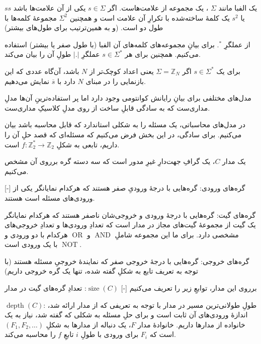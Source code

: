\documentclass[a4paper,12pt]{article}
\DeclareMathOperator{\size}{size}
\DeclareMathOperator{\depth}{depth}
\DeclareMathOperator{\AND}{AND}
\DeclareMathOperator{\OR}{OR}
\DeclareMathOperator{\NOT}{NOT}
\begin{document}


یک الفبا مانند 
\(\Sigma\)
، یک مجموعه از علامت‌هاست.
اگر 
\(s \in \Sigma\)
یکی از آن علامت‌ها باشد
\(s s\)
یا
\(s^2\)
یک کلمهٔ ساخته‌شده با تکرارِ آن علامت است و همچنین 
\(\Sigma^2\)
 مجموعهٔ کلمه‌ها با طول دو است. (و به همین‌ترتیب برای طول‌های بیشتر)

از عملگرِ 
\(.^*\)
برای بیانِ مجموعه‌های کلمه‌های آن الفبا (با طول صفر یا بیشتر) استفاده می‌کنیم. همچنین برای هر 
\(s \in \Sigma^*\)
عملگرِ \(|.|\) طولِ آن را بیان می‌کند.

برای یک 
\(s \in \Sigma^*\)
اگر 
\(\Sigma = \mathbb{Z}_N\)
یعنی اعداد کوچک‌تر از \(N\) باشد، آن‌گاه عددی که این بازنمایی را در مبنای \(N\) دارد با
\(\overline{s}\)
نمایش می‌دهیم.

مدل‌های مختلفی برای بیانِ رایانش کوانتومی وجود دارد اما پر استفاده‌ترینِ آن‌ها مدلِ مداری‌ست که به سادگی قابلِ ساخت از روی مدلِ کلاسیکِ مداری‌ست.

در مدل‌های محاسباتی، یک مسئله را به شکلی استاندارد که قابل محاسبه باشد بیان می‌کنیم. برای سادگی، در این بخش فرض می‌کنیم که مسئله‌ای که قصد حلِ آن را داریم، تابعی به شکلِ
\(f: \mathbb{Z}_2^* \to \mathbb{Z}_2\)
است.

 
یک مدار \(C\)، یک گرافِ جهت‌دارِ غیرِ مدور است که سه دسته گره برروی آن مشخص می‌کنیم.

[-]
 گره‌های ورودی: گره‌هایی با درجهٔ ورودیِ صفر هستند که هرکدام نمایانگر یکی از ورودی‌های مسئله است
هستند.

 گره‌های گیت: گره‌هایی با درجهٔ ورودی و خروجی‌شان ناصفر هستند که هرکدام نمایانگر یک گیت از مجموعهٔ گیت‌های مجاز در مدار است که تعدادِ ورودی‌ها و تعدادِ خروجی‌های مشخصی دارد. برای ما این مجموعه شاملِ 
\(\AND\)
و 
\(\OR\)
هرکدام با دو ورودی و 
\(\NOT\)
 با یک ورودی است.

 گره‌های خروجی: گره‌هایی با درجهٔ خروجی صفر که نمایندهٔ خروجیِ مسئله هستند (با توجه به تعریف تابع به شکلِ گفته شده، تنها یک گره خروجی داریم)


برروی این مدار، توابعِ زیر را تعریف می‌کنیم
[-]
\(\size(C)\):
تعدادِ گره‌های گیت در مدار

\(\depth(C)\):
طولِ طولانی‌ترین مسیر در مدار
با توجه به تعریفی که از مدار ارائه شد، اندازهٔ ورودی‌های آن ثابت است و برای حلِ مسئله به شکلی که گفته شد، نیاز به یک خانواده از مدارها داریم. خانوادهٔ مدار \(F\)، یک دنباله از مدارها به شکلِ
\((F_1, F_2, \dots)\)
است که \(F_i\) برای ورودی با طولِ \(i\) تابعِ \(f\) را محاسبه می‌کند.
\end{document}
